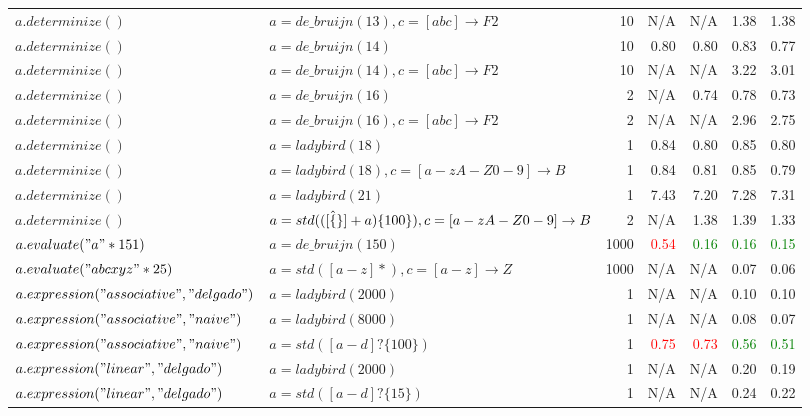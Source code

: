 \begin{tabular}{llr *{4}{r}}
$a.determinize()$ & $a = de\_bruijn(13), c = [abc] \rightarrow F2$ & 10 &   N/A &   N/A & \num{ 1.38} & \num{ 1.38} \\
$a.determinize()$ & $a = de\_bruijn(14)$ & 10 & \num{ 0.80} & \num{ 0.80} & \num{ 0.83} & \num{ 0.77} \\
$a.determinize()$ & $a = de\_bruijn(14), c = [abc] \rightarrow F2$ & 10 &   N/A &   N/A & \num{ 3.22} & \num{ 3.01} \\
$a.determinize()$ & $a = de\_bruijn(16)$ & 2 &   N/A & \num{ 0.74} & \num{ 0.78} & \num{ 0.73} \\
$a.determinize()$ & $a = de\_bruijn(16), c = [abc] \rightarrow F2$ & 2 &   N/A &   N/A & \num{ 2.96} & \num{ 2.75} \\
$a.determinize()$ & $a = ladybird(18)$ & 1 & \num{ 0.84} & \num{ 0.80} & \num{ 0.85} & \num{ 0.80} \\
$a.determinize()$ & $a = ladybird(18), c = [a-zA-Z0-9] \rightarrow B$ & 1 & \num{ 0.84} & \num{ 0.81} & \num{ 0.85} & \num{ 0.79} \\
$a.determinize()$ & $a = ladybird(21)$ & 1 & \num{ 7.43} & \num{ 7.20} & \num{ 7.28} & \num{ 7.31} \\
$a.determinize()$ & $a = std(([\hat\{\}]+a)\{100\}), c = [a-zA-Z0-9] \rightarrow B$ & 2 &   N/A & \num{ 1.38} & \num{ 1.39} & \num{ 1.33} \\
$a.evaluate("a"*151)$ & $a = de\_bruijn(150)$ & 1000 & \textcolor{red}{\num{ 0.54}} & \textcolor{green}{\num{ 0.16}} & \textcolor{green}{\num{ 0.16}} & \textcolor{green}{\num{ 0.15}} \\
$a.evaluate("abcxyz"*25)$ & $a = std([a-z]*), c = [a-z] \rightarrow Z$ & 1000 &   N/A &   N/A & \num{ 0.07} & \num{ 0.06} \\
$a.expression("associative", "delgado")$ & $a = ladybird(2000)$ & 1 &   N/A &   N/A & \num{ 0.10} & \num{ 0.10} \\
$a.expression("associative", "naive")$ & $a = ladybird(8000)$ & 1 &   N/A &   N/A & \num{ 0.08} & \num{ 0.07} \\
$a.expression("associative", "naive")$ & $a = std([a-d]?\{100\})$ & 1 & \textcolor{red}{\num{ 0.75}} & \textcolor{red}{\num{ 0.73}} & \textcolor{green}{\num{ 0.56}} & \textcolor{green}{\num{ 0.51}} \\
$a.expression("linear", "delgado")$ & $a = ladybird(2000)$ & 1 &   N/A &   N/A & \num{ 0.20} & \num{ 0.19} \\
$a.expression("linear", "delgado")$ & $a = std([a-d]?\{15\})$ & 1 &   N/A &   N/A & \num{ 0.24} & \num{ 0.22} \\

\end{tabular}
